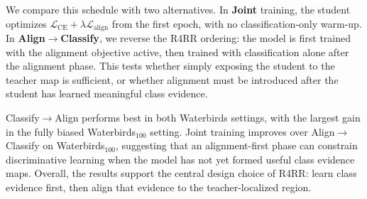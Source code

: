 \documentclass[10pt,twocolumn,letterpaper]{article}
\begin{document}
We compare this schedule with two alternatives. In \textbf{Joint} training, the student optimizes $\mathcal{L}_{\mathrm{CE}}+\lambda\mathcal{L}_{\mathrm{align}}$ from the first epoch, with no classification-only warm-up. In \textbf{Align$\rightarrow$Classify}, we reverse the R4RR ordering: the model is first trained with the alignment objective active, then trained with classification alone after the alignment phase. This tests whether simply exposing the student to the teacher map is sufficient, or whether alignment must be introduced after the student has learned meaningful class evidence.

\begin{table}[h]
\centering
\caption{\textbf{Training-curriculum ablation on Waterbirds.}
Classify$\rightarrow$Align is the schedule used by R4RR. Results are mean$\pm$standard deviation over five seeds. Higher is better.}
\label{tab:curriculum_ablation}
\small
\setlength{\tabcolsep}{6pt}
\renewcommand{\arraystretch}{1.12}
\end{table}

Classify$\rightarrow$Align performs best in both Waterbirds settings, with the largest gain in the fully biased Waterbirds$_{100}$ setting. Joint training improves over Align$\rightarrow$Classify on Waterbirds$_{100}$, suggesting that an alignment-first phase can constrain discriminative learning when the model has not yet formed useful class evidence maps. Overall, the results support the central design choice of R4RR: learn class evidence first, then align that evidence to the teacher-localized region.
\end{document}

